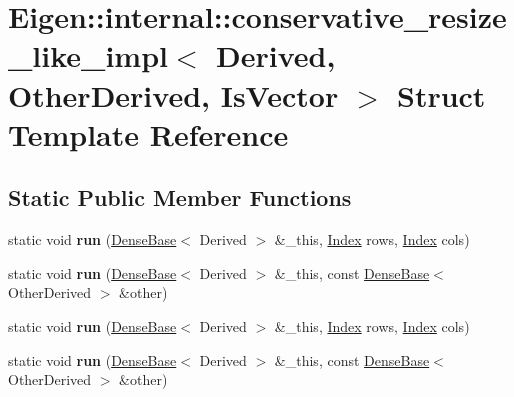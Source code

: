 \hypertarget{struct_eigen_1_1internal_1_1conservative__resize__like__impl}{}\section{Eigen\+:\+:internal\+:\+:conservative\+\_\+resize\+\_\+like\+\_\+impl$<$ Derived, Other\+Derived, Is\+Vector $>$ Struct Template Reference}
\label{struct_eigen_1_1internal_1_1conservative__resize__like__impl}
\subsection*{Static Public Member Functions}
\begin{DoxyCompactItemize}
\item 
\mbox{\label{struct_eigen_1_1internal_1_1conservative__resize__like__impl_af0084305baab7e1026cf70dba792f0b6}} 
static void {\bfseries run} (\hyperlink{group___core___module_class_eigen_1_1_dense_base}{Dense\+Base}$<$ Derived $>$ \&\+\_\+this, \hyperlink{namespace_eigen_a62e77e0933482dafde8fe197d9a2cfde}{Index} rows, \hyperlink{namespace_eigen_a62e77e0933482dafde8fe197d9a2cfde}{Index} cols)
\item 
\mbox{\label{struct_eigen_1_1internal_1_1conservative__resize__like__impl_afe2945bf1a4b75309e106fb7d361a736}} 
static void {\bfseries run} (\hyperlink{group___core___module_class_eigen_1_1_dense_base}{Dense\+Base}$<$ Derived $>$ \&\+\_\+this, const \hyperlink{group___core___module_class_eigen_1_1_dense_base}{Dense\+Base}$<$ Other\+Derived $>$ \&other)
\item 
\mbox{\label{struct_eigen_1_1internal_1_1conservative__resize__like__impl_af0084305baab7e1026cf70dba792f0b6}} 
static void {\bfseries run} (\hyperlink{group___core___module_class_eigen_1_1_dense_base}{Dense\+Base}$<$ Derived $>$ \&\+\_\+this, \hyperlink{namespace_eigen_a62e77e0933482dafde8fe197d9a2cfde}{Index} rows, \hyperlink{namespace_eigen_a62e77e0933482dafde8fe197d9a2cfde}{Index} cols)
\item 
\mbox{\label{struct_eigen_1_1internal_1_1conservative__resize__like__impl_afe2945bf1a4b75309e106fb7d361a736}} 
static void {\bfseries run} (\hyperlink{group___core___module_class_eigen_1_1_dense_base}{Dense\+Base}$<$ Derived $>$ \&\+\_\+this, const \hyperlink{group___core___module_class_eigen_1_1_dense_base}{Dense\+Base}$<$ Other\+Derived $>$ \&other)
\end{DoxyCompactItemize}


